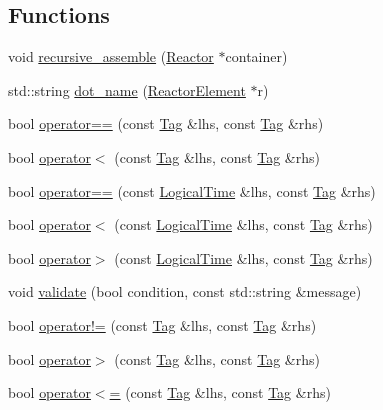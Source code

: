 \subsection*{Functions}
\begin{DoxyCompactItemize}
\item 
void \hyperlink{namespacereactor_a50e4996eb605ff7e10a26dcdbae25340}{recursive\+\_\+assemble} (\hyperlink{classreactor_1_1Reactor}{Reactor} $\ast$container)
\item 
std\+::string \hyperlink{namespacereactor_a3acae8d24d419d39f72ca08bccf13c94}{dot\+\_\+name} (\hyperlink{classreactor_1_1ReactorElement}{Reactor\+Element} $\ast$r)
\item 
bool \hyperlink{namespacereactor_a0c98d4882f478da43c2c1a169a1fedd2}{operator==} (const \hyperlink{classreactor_1_1Tag}{Tag} \&lhs, const \hyperlink{classreactor_1_1Tag}{Tag} \&rhs)
\item 
bool \hyperlink{namespacereactor_a92dbf562adb06209a1f5632d5e2a0155}{operator$<$} (const \hyperlink{classreactor_1_1Tag}{Tag} \&lhs, const \hyperlink{classreactor_1_1Tag}{Tag} \&rhs)
\item 
bool \hyperlink{namespacereactor_a55f3e1662b62c0347fb588c294b3f471}{operator==} (const \hyperlink{classreactor_1_1LogicalTime}{Logical\+Time} \&lhs, const \hyperlink{classreactor_1_1Tag}{Tag} \&rhs)
\item 
bool \hyperlink{namespacereactor_a632f1427effbba727fcb9f5aa38d6e03}{operator$<$} (const \hyperlink{classreactor_1_1LogicalTime}{Logical\+Time} \&lhs, const \hyperlink{classreactor_1_1Tag}{Tag} \&rhs)
\item 
bool \hyperlink{namespacereactor_ae9b630f4a987aba9a98c138dd23e87b5}{operator$>$} (const \hyperlink{classreactor_1_1LogicalTime}{Logical\+Time} \&lhs, const \hyperlink{classreactor_1_1Tag}{Tag} \&rhs)
\item 
void \hyperlink{namespacereactor_afb17997129c7498eff1148813c8970d0}{validate} (bool condition, const std\+::string \&message)
\item 
bool \hyperlink{namespacereactor_a550a07297e731136c8d7570395c5128d}{operator!=} (const \hyperlink{classreactor_1_1Tag}{Tag} \&lhs, const \hyperlink{classreactor_1_1Tag}{Tag} \&rhs)
\item 
bool \hyperlink{namespacereactor_a2e90ae0e79dfde9f7fbeb54d66a1e3a8}{operator$>$} (const \hyperlink{classreactor_1_1Tag}{Tag} \&lhs, const \hyperlink{classreactor_1_1Tag}{Tag} \&rhs)
\item 
bool \hyperlink{namespacereactor_adb763d87ec4b89428e75916a5150da36}{operator$<$=} (const \hyperlink{classreactor_1_1Tag}{Tag} \&lhs, const \hyperlink{classreactor_1_1Tag}{Tag} \&rhs)

\end{DoxyCompactItemize}
